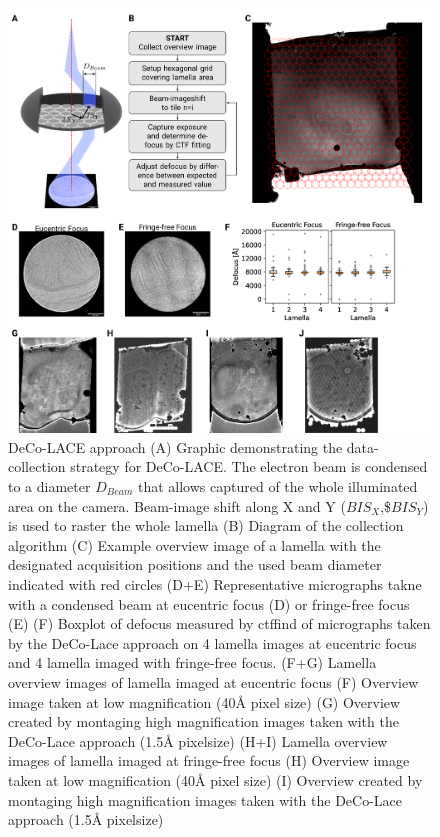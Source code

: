 \documentclass[
]{article}
\begin{document}
\begin{figure}
\hypertarget{fig:approach}{%
\centering
\includegraphics{figures/approach.png}
\caption{DeCo-LACE approach (A) Graphic demonstrating the data-collection strategy for
DeCo-LACE. The electron beam is condensed to a diameter \(D_{Beam}\) that allows captured of
the whole illuminated area on the camera. Beam-image shift along X and Y
(\(BIS_X\),\$\(BIS_Y\)) is used to raster the whole lamella
(B) Diagram of the collection algorithm
(C) Example overview image of a lamella with the designated acquisition
positions and the used beam diameter indicated with red circles
(D+E) Representative micrographs takne with a condensed beam at eucentric focus
(D) or fringe-free focus (E)
(F) Boxplot of defocus measured by ctffind of micrographs taken by the DeCo-Lace
approach on 4 lamella images at eucentric focus and 4 lamella imaged with
fringe-free focus.
(F+G) Lamella overview images of lamella imaged at eucentric focus (F) Overview
image taken at low magnification (40Å pixel size) (G) Overview created by
montaging high magnification images taken with the DeCo-Lace approach (1.5Å
pixelsize)
(H+I) Lamella overview images of lamella imaged at fringe-free focus (H) Overview
image taken at low magnification (40Å pixel size) (I) Overview created by
montaging high magnification images taken with the DeCo-Lace approach (1.5Å
pixelsize)}\label{fig:approach}
}
\end{figure}
\end{document}
